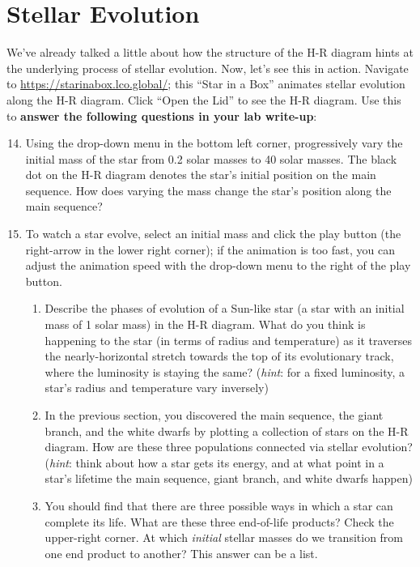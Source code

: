 \documentclass[11pt]{article}
\begin{document}
\section{Stellar Evolution}
We've already talked a little about how the structure of the H-R diagram hints at the underlying process of stellar evolution. Now, let's see this in action. Navigate to \url{https://starinabox.lco.global/}; this ``Star in a Box'' animates stellar evolution along the H-R diagram. Click ``Open the Lid'' to see the H-R diagram. Use this to \textbf{answer the following questions in your lab write-up}:
\begin{enumerate}
\setcounter{enumi}{13}

    \item Using the drop-down menu in the bottom left corner, progressively vary the initial mass of the star from 0.2 solar masses to 40 solar masses. The black dot on the H-R diagram denotes the star's initial position on the main sequence. How does varying the mass change the star's position along the main sequence? 
    
    \item To watch a star evolve, select an initial mass and click the play button (the right-arrow in the lower right corner); if the animation is too fast, you can adjust the animation speed with the drop-down menu to the right of the play button.
    \begin{enumerate}
    
        \item Describe the phases of evolution of a Sun-like star (a star with an initial mass of 1 solar mass) in the H-R diagram. What do you think is happening to the star (in terms of radius and temperature) as it traverses the nearly-horizontal stretch towards the top of its evolutionary track, where the luminosity is staying the same? (\emph{hint}: for a fixed luminosity, a star's radius and temperature vary inversely)  
        
        \item In the previous section, you discovered the main sequence, the giant branch, and the white dwarfs by plotting a collection of stars on the H-R diagram. How are these three populations connected via stellar evolution? (\emph{hint}: think about how a star gets its energy, and at what point in a star's lifetime the main sequence, giant branch, and white dwarfs happen)
        
        \item You should find that there are three possible ways in which a star can complete its life. What are these three end-of-life products? Check the upper-right corner. At which \emph{initial} stellar masses do we transition from one end product to another? This answer can be a list.
        
    \end{enumerate}

\end{enumerate}
\end{document}
